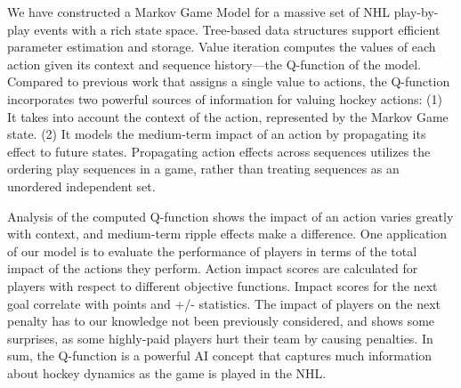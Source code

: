 \documentclass[]{article}
\begin{document}
We have constructed a Markov Game Model for a massive set of NHL play-by-play events with a rich state space.%
Tree-based data structures support efficient parameter estimation and storage. Value iteration computes the values of each action given its context and sequence history---the Q-function of the model. Compared to previous work that assigns a single value to actions, the Q-function incorporates two powerful sources of information for valuing hockey actions: (1) It takes into account the context of the action, represented by the Markov Game state. (2) It models the medium-term impact of an action by propagating its effect to future states. %
Propagating action effects across sequences utilizes the ordering play sequences in a game, rather than treating sequences as an unordered independent set.

Analysis of the computed Q-function shows the impact of an action varies greatly with context, and medium-term ripple effects make a difference. One application of our model is to evaluate the performance of players in terms of the total impact of the actions they perform. Action impact scores are calculated for players with respect to different objective functions. Impact scores for the next goal correlate with points and +/- statistics. The impact of players on the next penalty has to our knowledge
not been previously considered, and shows some surprises, as some highly-paid players hurt their team by causing penalties. %
In sum, the Q-function is a powerful AI concept that captures much information about hockey dynamics as the game is played in the NHL.
\end{document}
